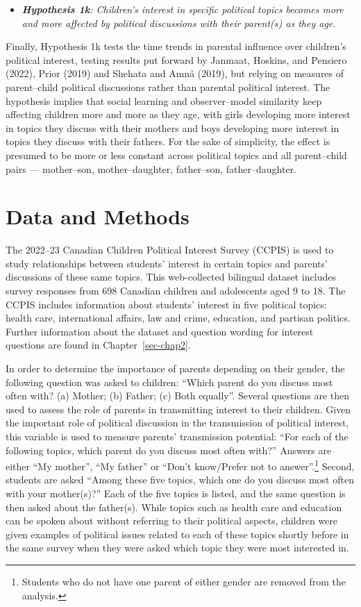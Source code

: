 \documentclass[
  letterpaper,
  DIV=11,
  numbers=noendperiod]{scrreprt}
\providecommand{\tightlist}{%
  \setlength{\itemsep}{0pt}\setlength{\parskip}{0pt}}\usepackage{longtable,booktabs,array}
\begin{document}
\begin{itemize}
\tightlist
\item
  \emph{\textbf{Hypothesis 1k}: Children's interest in specific
  political topics becomes more and more affected by political
  discussions with their parent(s) as they age.}
\end{itemize}

Finally, Hypothesis 1k tests the time trends in parental influence over
children's political interest, testing results put forward by Janmaat,
Hoskins, and Pensiero (2022), Prior (2019) and Shehata and Amnå (2019),
but relying on measures of parent--child political discussions rather
than parental political interest. The hypothesis implies that social
learning and observer--model similarity keep affecting children more and
more as they age, with girls developing more interest in topics they
discuss with their mothers and boys developing more interest in topics
they discuss with their fathers. For the sake of simplicity, the effect
is presumed to be more or less constant across political topics and all
parent--child pairs --- mother--son, mother--daughter, father--son,
father--daughter.

\section{Data and Methods}\label{data-and-methods-1}

The 2022--23 Canadian Children Political Interest Survey (CCPIS) is used
to study relationships between students' interest in certain topics and
parents' discussions of these same topics. This web-collected bilingual
dataset includes survey responses from 698 Canadian children and
adolescents aged 9 to 18. The CCPIS includes information about students'
interest in five political topics: health care, international affairs,
law and crime, education, and partisan politics. Further information
about the dataset and question wording for interest questions are found
in Chapter~\ref{sec-chap2}.

In order to determine the importance of parents depending on their
gender, the following question was asked to children: ``Which parent do
you discuss most often with? (a) Mother; (b) Father; (c) Both equally''.
Several questions are then used to assess the role of parents in
transmitting interest to their children. Given the important role of
political discussion in the transmission of political interest, this
variable is used to measure parents' transmission potential: ``For each
of the following topics, which parent do you discuss most often with?''
Answers are either ``My mother'', ``My father'' or ``Don't know/Prefer
not to answer''.\footnote{Students who do not have one parent of either
  gender are removed from the analysis.} Second, students are asked
``Among these five topics, which one do you discuss most often with your
mother(s)?'' Each of the five topics is listed, and the same question is
then asked about the father(s). While topics such as health care and
education can be spoken about without referring to their political
aspects, children were given examples of political issues related to
each of these topics shortly before in the same survey when they were
asked which topic they were most interested in.
\end{document}
